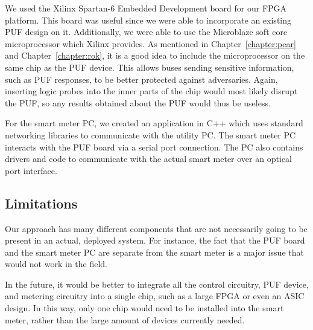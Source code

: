 We used the Xilinx Spartan-6 Embedded Development board for our FPGA platform. This board was useful since we 
were able to incorporate an existing PUF design on it. Additionally, we were able to use the Microblaze soft core
microprocessor which Xilinx provides. As mentioned in Chapter~\ref{chapter:pear} and Chapter~\ref{chapter:rok},
it is a good idea to include the microprocessor on the same chip as the PUF device. This allows buses sending
sensitive information, such as PUF responses, to be better protected against adversaries. Again, inserting logic
probes into the inner parts of the chip would most likely disrupt the PUF, so any results obtained about the PUF would
thus be useless.

For the smart meter PC, we created an application in C++ which uses standard networking libraries to communicate
with the utility PC. The smart meter PC interacts with the PUF board via a serial port connection. The PC also contains
drivers and code to communicate with the actual smart meter over an optical port interface.

\subsection{Limitations}
Our approach has many different components that are not necessarily going to be present in an actual, deployed
system. For instance, the fact that the PUF board and the smart meter PC are separate from the smart meter is
a major issue that would not work in the field. 

In the future, it would be better to integrate all the control circuitry,
PUF device, and metering circuitry into a single chip, such as a large FPGA or even an ASIC design. In this way, only
one chip would need to be installed into the smart meter, rather than the large amount of devices currently needed.
